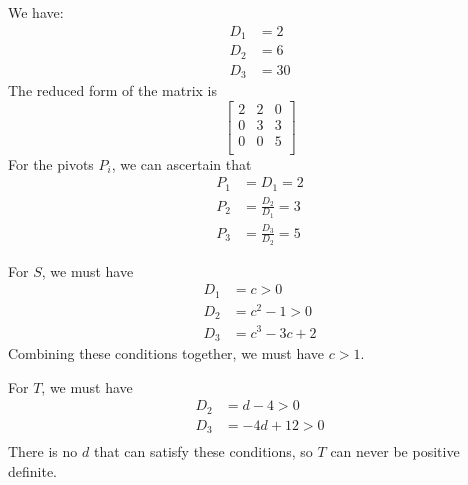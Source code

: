 \documentclass[a4paper]{article}
\begin{document}
We have:
\begin{align*}
	D_{1} & = 2 \\
	D_{2} & = 6 \\ 
	D_{3} & = 30
\end{align*}
The reduced form of the matrix is
\[
	\begin{bmatrix}
		2 & 2 & 0 \\
		0 & 3 & 3 \\
		0 & 0 & 5 \\
	\end{bmatrix}
\]
For the pivots \(P_{i}\), we can ascertain that
\begin{align*}
	P_{1} & = D_{1} = 2 \\
	P_{2} & = \frac{D_{2}}{D_{1}} = 3 \\ 
	P_{3} & = \frac{D_{3}}{D_{2}} = 5
\end{align*}


For \(S\), we must have
\begin{align*}
	D_{1} & = c > 0 \\
	D_{2} & = c^{2} - 1 > 0 \\ 
	D_{3} &  = c^{3} - 3c + 2 
\end{align*}
Combining these conditions together, we must have \(c > 1\).

For \(T\), we must have
\begin{align*}
	D_{2} & = d - 4 > 0 \\
	D_{3} & = -4d + 12 > 0  \\ 
\end{align*}
There is no \(d\) that can satisfy these conditions, so \(T\) can never be positive definite.

\vspace{12pt}

\end{document}
